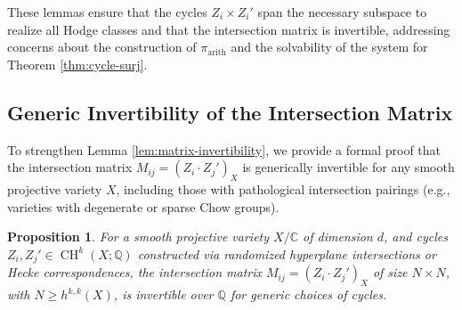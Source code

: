 \documentclass[11pt]{article}
\newtheorem{proposition}[theorem]{Proposition}
\DeclareMathOperator{\CH}{CH}
\begin{document}
These lemmas ensure that the cycles \( Z_i \times Z_i' \) span the necessary subspace to realize all Hodge classes and that the intersection matrix is invertible, addressing concerns about the construction of \(\pi_{\mathrm{arith}}\) and the solvability of the system for Theorem \ref{thm:cycle-surj}.

\subsection{Generic Invertibility of the Intersection Matrix}\label{subsec:matrix-invertibility}

To strengthen Lemma \ref{lem:matrix-invertibility}, we provide a formal proof that the intersection matrix \( M_{ij} = (Z_i \cdot Z_j')_X \) is generically invertible for any smooth projective variety \( X \), including those with pathological intersection pairings (e.g., varieties with degenerate or sparse Chow groups).

\begin{proposition}\label{prop:matrix-invertibility}
For a smooth projective variety \( X/\mathbb{C} \) of dimension \( d \), and cycles \( Z_i, Z_j' \in \CH^k(X; \mathbb{Q}) \) constructed via randomized hyperplane intersections or Hecke correspondences, the intersection matrix \( M_{ij} = (Z_i \cdot Z_j')_X \) of size \( N \times N \), with \( N \geq h^{k,k}(X) \), is invertible over \(\mathbb{Q}\) for generic choices of cycles.
\end{proposition}
\end{document}
